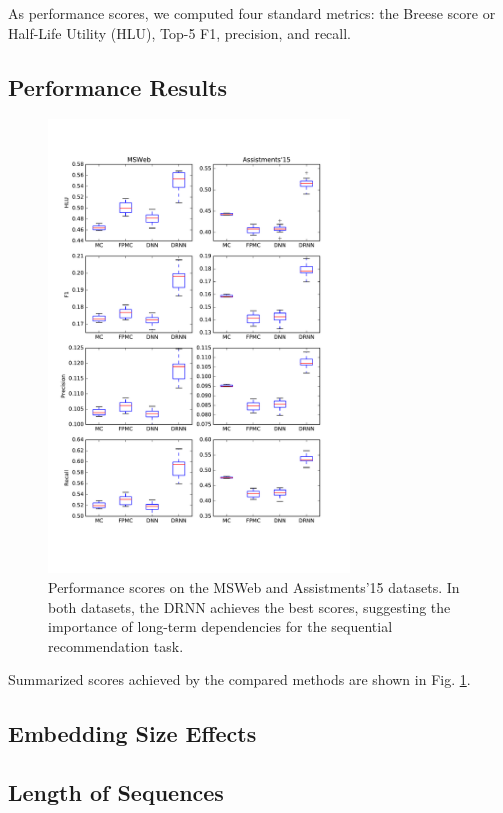 \documentclass{sig-alternate-05-2015}
\begin{document}
As performance scores, we computed four standard metrics: the Breese score or Half-Life Utility (HLU), Top-5 F1, precision, and recall. 



\subsection{Performance Results}
\begin{figure}
\includegraphics[width=8cm]{images/PerfBoxplots}		
\caption{Performance scores on the MSWeb and Assistments'15 datasets. In both datasets, the DRNN achieves the best scores,  suggesting the importance of long-term dependencies for the sequential recommendation task.}
\label{fig:PerfResults}
\end{figure}
Summarized scores achieved by the compared methods are shown in Fig. \ref{fig:PerfResults}.

\subsection{Embedding Size Effects}

\subsection{Length of Sequences}
\end{document}
